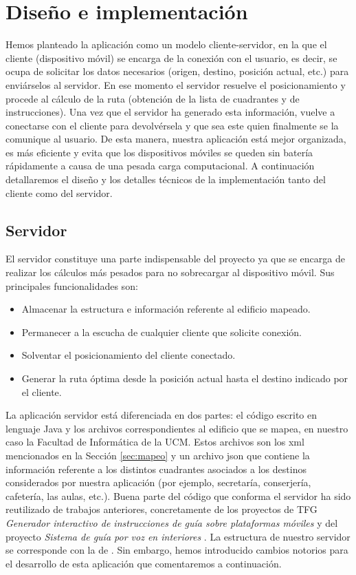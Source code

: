 \chapter{Diseño e implementación}
\label{cap:diseñoeimplementación}

Hemos planteado la aplicación como un modelo cliente-servidor, en la que el cliente (dispositivo móvil) se encarga de la conexión con el usuario, es decir, se ocupa de solicitar los datos necesarios (origen, destino, posición actual, etc.) para enviárselos al servidor. En ese momento el servidor resuelve el posicionamiento y procede al cálculo de la ruta (obtención de la lista de cuadrantes y de instrucciones). Una vez que el servidor ha generado esta información, vuelve a conectarse con el cliente para devolvérsela y que sea este quien finalmente se la comunique al usuario. De esta manera, nuestra aplicación está mejor organizada, es más eficiente y evita que los dispositivos móviles se queden sin batería rápidamente a causa de una pesada carga computacional. A continuación detallaremos el diseño y los detalles técnicos de la implementación tanto del cliente como del servidor.


\section{Servidor}
El servidor constituye una parte indispensable del proyecto ya que se encarga de realizar los cálculos más pesados para no sobrecargar al dispositivo móvil. Sus principales funcionalidades son:
\begin{itemize}
	\item Almacenar la estructura e información referente al edificio mapeado.
	\item Permanecer a la escucha de cualquier cliente que solicite conexión.
	\item Solventar el posicionamiento del cliente conectado.
	\item Generar la ruta óptima desde la posición actual hasta el destino indicado por el cliente.
\end{itemize} 

La aplicación servidor está diferenciada en dos partes: el código escrito en lenguaje Java y los archivos correspondientes al edificio que se mapea, en nuestro caso la Facultad de Informática de la UCM. Estos archivos son los xml mencionados en la Sección \ref{sec:mapeo} y un archivo json que contiene la información referente a los distintos cuadrantes asociados a los destinos considerados por nuestra aplicación (por ejemplo, secretaría, conserjería, cafetería, las aulas,  etc.). 
Buena parte del código que conforma el servidor ha sido reutilizado de trabajos anteriores, concretamente de los proyectos de TFG \textit{Generador interactivo de instrucciones de guía sobre plataformas móviles} \citep{TFGguia} y del proyecto \textit{Sistema de guía por voz en interiores} \citep{TFGMariana}. La estructura de nuestro servidor se corresponde con la de \cite{TFGguia}. Sin embargo, hemos introducido cambios notorios para el desarrollo de esta aplicación que comentaremos a continuación.

